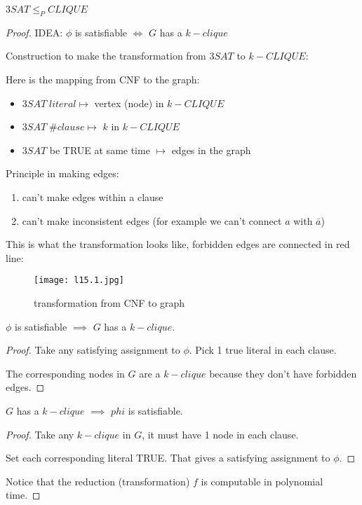 \begin{theorem}
    \(3SAT \leq_P CLIQUE\) 
\end{theorem}
\begin{proof}
    IDEA: \(\phi\) is satisfiable \(\iff\) \(G\) has a \(k-clique\)        

    Construction to make the transformation from \(3SAT\) to \(k-CLIQUE\):
    \begin{remark}[Transformation]
        Here is the mapping from CNF to the graph:
        \begin{itemize}
            \item \(3SAT \; literal \mapsto \) vertex (node) in \(k-CLIQUE\)   
            \item \(3SAT \; \#clause \mapsto\) \(k\) in \(k-CLIQUE\)   
            \item \(3SAT\) be TRUE at same time \(\mapsto\) edges in the graph
        \end{itemize}

        Principle in making edges:
        \begin{enumerate}
            \item can't make edges within a clause
            \item can't make inconsistent edges (for example we can't connect \(a\) with \(\bar{a}\))
        \end{enumerate}

        This is what the transformation looks like, forbidden edges are connected in red line:
        \begin{figure}[H]
            \centering
            \texttt{[image: l15.1.jpg]}
            \caption{transformation from CNF to graph}
        \end{figure}
    \end{remark}

    \begin{lemma}[Forward]
        \(\phi\) is satisfiable \(\implies\) \(G\) has a \(k-clique\).   
    \end{lemma}
    \begin{proof}
        Take any satisfying assignment to \(\phi\). Pick 1 true literal in each clause. 

        The corresponding nodes in \(G\) are a \(k-clique\) because they don't have forbidden edges.  
    \end{proof}

    \begin{lemma}[Backward]
        \(G\) has a \(k-clique\) \(\implies\) \(phi\) is satisfiable.
    \end{lemma}
    \begin{proof}
        Take any \(k-clique\) in \(G\), it must have 1 node in each clause.  

        Set each corresponding literal TRUE. That gives a satisfying assignment to \(\phi\). 
    \end{proof}

    Notice that the reduction (transformation) \(f\) is computable in polynomial time. 
\end{proof}

